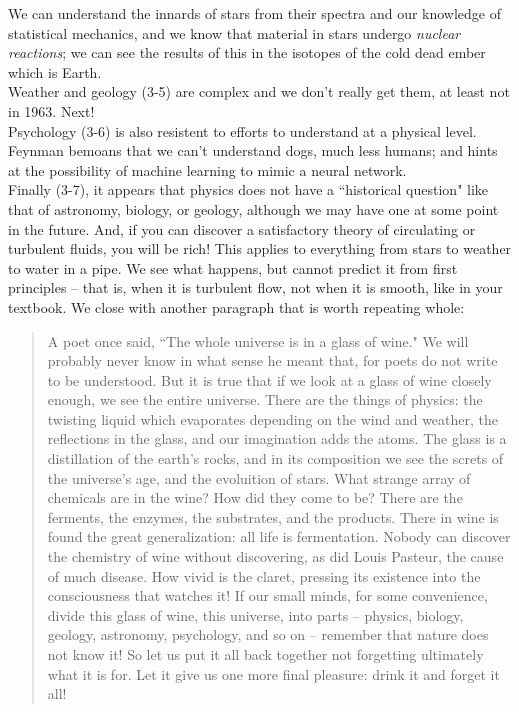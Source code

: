 \documentclass[10pt,letterpaper]{article}
\begin{document}
\indent We can understand the innards of stars from their spectra and our knowledge of statistical mechanics, and we know that material in stars undergo \textit{nuclear reactions}; we can see the results of this in the isotopes of the cold dead ember which is Earth. \\
\indent Weather and geology (3-5) are complex and we don't really get them, at least not in 1963. Next! \\
\indent Psychology (3-6) is also resistent to efforts to understand at a physical level. Feynman bemoans that we can't understand dogs, much less humans; and hints at the possibility of machine learning to mimic a neural network. \\
\indent Finally (3-7), it appears that physics does not have a ``historical question" like that of astronomy, biology, or geology, although we may have one at some point in the future. And, if you can discover a satisfactory theory of circulating or turbulent fluids, you will be rich! This applies to everything from stars to  weather to water in a pipe. We see what happens, but cannot predict it from first principles -- that is, when it is turbulent flow, not when it is smooth, like in your textbook. We close with another paragraph that is worth repeating whole: 
\begin{quote}
A poet once said, ``The whole universe is in a glass of wine." We will probably never know in what sense he meant that, for poets do not write to be understood. But it is true that if we look at a glass of wine closely enough, we see the entire universe. There are the things of physics: the twisting liquid which evaporates depending on the wind and weather, the reflections in the glass, and our imagination adds the atoms. The glass is a distillation of the earth's rocks, and in its composition we see the screts of the universe's age, and the evoluition of stars. What strange array of chemicals are in the wine? How did they come to be? There are the ferments, the enzymes, the substrates, and the products. There in wine is found the great generalization: all life is fermentation. Nobody can discover the chemistry of wine without discovering, as did Louis Pasteur, the cause of much disease. How vivid is the claret, pressing its existence into the consciousness that watches it! If our small minds, for some convenience, divide this glass of wine, this universe, into parts -- physics, biology, geology, astronomy, psychology, and so on -- remember that nature does not know it! So let us put it all back together not forgetting ultimately what it is for. Let it give us one more final pleasure: drink it and forget it all! 
\end{quote}
\end{document}
